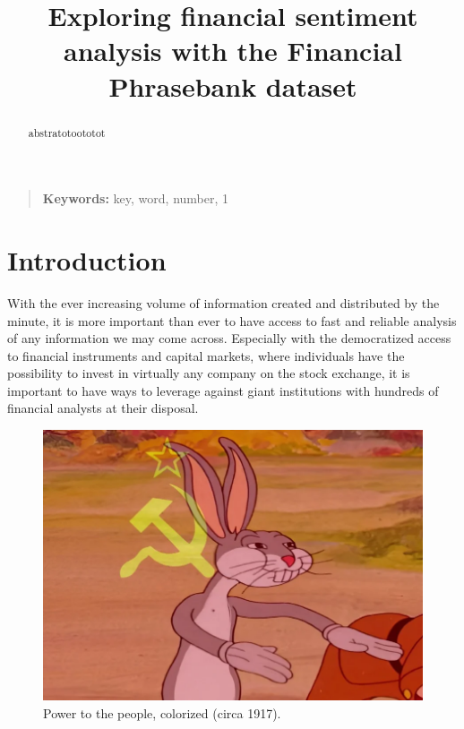 \documentclass[conference]{IEEEtran}
\begin{document}
\title{Exploring financial sentiment analysis with the Financial Phrasebank dataset}

\author{
\and
{}
}

\maketitle
\thispagestyle{plain}

\begin{abstract}
abstratotoototot
\end{abstract}

\begin{quote}
\small
\noindent
\textbf{Keywords:} key, word, number, 1
\end{quote}

\IEEEpeerreviewmaketitle


\section{Introduction}

With the ever increasing volume of information created and distributed by the minute, it is more important than ever to have access to fast and reliable analysis of any information we may come across. Especially with the democratized access to financial instruments and capital markets, where individuals have the possibility to invest in virtually any company on the stock exchange, it is important to have ways to leverage against giant institutions with hundreds of financial analysts at their disposal. 

\begin{figure}[H]
    \centering
    \includegraphics[width=0.5\linewidth]{bugs.png}
    \caption{Power to the people, colorized (circa 1917).}
    \label{fig:enter-label}
\end{figure}
\end{document}
